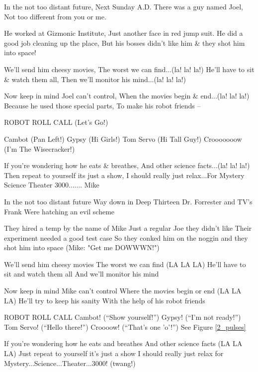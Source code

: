 In the not too distant future, 
Next Sunday A.D. 
There was a guy named Joel, 
Not too different from you or me. 

He worked at Gizmonic Institute, 
Just another face in red jump suit. 
He did a good job cleaning up the place, 
But his bosses didn't like him \&
they shot him into space! 


We'll send him cheesy movies, 
The worst we can find...(la! la! la!) 
He'll have to sit \& watch them all, 
Then we'll monitor his mind...(la! la! la!) 

Now keep in mind Joel can't control, 
When the movies begin \& end...(la! la! la!) 
Because he used those special parts, 
To make his robot friends -- 

ROBOT ROLL CALL (Let's Go!) 

Cambot (Pan Left!) 
Gypsy (Hi Girls!) 
Tom Servo (Hi Tall Guy!) 
Crooooooow (I'm The Wisecracker!) 

If you're wondering how he eats \& breathes, 
And other science facts...(la! la! la!) 
Then repeat to yourself its just a show, 
I should really just relax...For Mystery Science Theater 
3000....... Mike 

In the not too distant future 
Way down in Deep Thirteen 
Dr. Forrester and TV's Frank 
Were hatching an evil scheme 

They hired a temp by the name of Mike 
Just a regular Joe they didn't like 
Their experiment needed a good test case 
So they conked him on the noggin and they shot him into space 
(Mike: "Get me DOWWWN!") 

We'll send him cheesy movies 
The worst we can find (LA LA LA) 
He'll have to sit and watch them all 
And we'll monitor his mind 

Now keep in mind Mike can't control 
Where the movies begin or end (LA LA LA) 
He'll try to keep his sanity 
With the help of his robot friends 


ROBOT ROLL CALL 
Cambot! (``Show yourself!'') 
Gypsy! (``I'm not ready!'') 
Tom Servo! (``Hello there!'') 
Croooow! (``That's one 'o'!'')
See Figure \ref{2_pulses}

If you're wondering how he eats and breathes 
And other science facts (LA LA LA) 
Just repeat to yourself it's just a show 
I should really just relax for Mystery...Science...Theater...3000! 
(twang!) 
